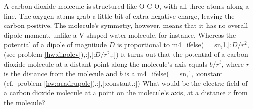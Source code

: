 A carbon dioxide molecule is structured like O-C-O, with all three
atoms along a line. The oxygen atoms grab a little bit of extra
negative charge, leaving the carbon positive.  The molecule's
symmetry, however, means that it has no overall dipole moment, unlike
a V-shaped water molecule, for instance.  Whereas the potential of a
dipole of magnitude $D$ is proportional to 
m4_ifelse(__sn,1,[:$D/r^2$, (see problem \ref{hw:dipolev}),:],[:$D/r^2$,:])
it turns out that the potential of a carbon dioxide
molecule at a distant point along the molecule's axis equals $b/r^3$,
where $r$ is the distance from the molecule and $b$ is a
m4_ifelse(__sn,1,[:constant (cf.~problem \ref{hw:quadrupole}).:],[:constant.:])
What would be the electric field of a
carbon dioxide molecule at a point on the molecule's axis, at a
distance $r$ from the molecule?\answercheck

